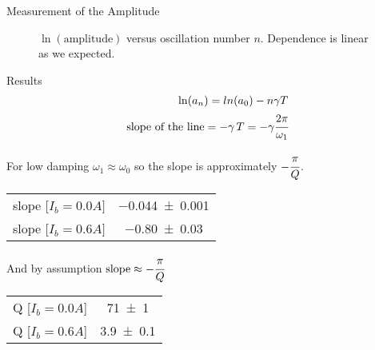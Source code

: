 \begin{frame}{Measurement of the Amplitude}
\begin{figure}[ht]
	\caption{$\ln(\text{amplitude})$ versus oscillation number $n$. Dependence is linear as we expected.}
	\label{fig:log-plot}
	\end{figure}

\end{frame}

\begin{frame}{Results}
\begin{align*}
\ln(a_n) = ln(a_0) - n \gamma T \\
\text{slope of the line} =  -\gamma \, T = -\gamma \cfrac{2 \pi}{\omega_1}
\end{align*}
\pause

For low damping $\omega_1 \approx \omega_0$ so the slope is approximately $-\cfrac{\pi}{Q}$.
\begin{table}\centering
\begin{tabular}{c c} 
	\toprule
	slope [$I_b=0.0A]$ & \num{-0.044 \pm 0.001}\\
	slope [$I_b=0.6A]$ & \num{-0.80 \pm 0.03} \\
	\bottomrule
\end{tabular}
\end{table}
\pause
And by assumption $\text{slope} \approx -\cfrac{\pi}{Q}$
\begin{table}[H]\centering
	\begin{tabular}{c c} 
		\toprule
		Q [$I_b=0.0A$] & \num{71 \pm 1} \\
		Q [$I_b=0.6A$] & \num{3.9 \pm 0.1} \\
		\bottomrule
	\end{tabular}
\end{table}

\end{frame}


